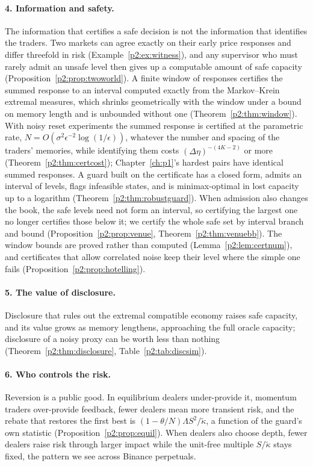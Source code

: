 \paragraph{4. Information and safety.} The information that certifies a safe decision is not the information that identifies the traders. Two markets can agree exactly on their early price responses and differ threefold in risk (Example~\ref{p2:ex:witness}), and any supervisor who must rarely admit an unsafe level then gives up a computable amount of safe capacity (Proposition~\ref{p2:prop:twoworld}). A finite window of responses certifies the summed response to an interval computed exactly from the Markov--Krein extremal measures, which shrinks geometrically with the window under a bound on memory length and is unbounded without one (Theorem~\ref{p2:thm:window}). With noisy reset experiments the summed response is certified at the parametric rate, $N=O(\sigma^2\epsilon^{-2}\log(1/\epsilon))$, whatever the number and spacing of the traders' memories, while identifying them costs $(\Delta\eta)^{-(4K-2)}$ or more (Theorem~\ref{p2:thm:certcost}); Chapter~\ref{ch:p1}'s hardest pairs have identical summed responses. A guard built on the certificate has a closed form, admits an interval of levels, flags infeasible states, and is minimax-optimal in lost capacity up to a logarithm (Theorem~\ref{p2:thm:robustguard}). When admission also changes the book, the safe levels need not form an interval, so certifying the largest one no longer certifies those below it; we certify the whole safe set by interval branch and bound (Proposition~\ref{p2:prop:venue}, Theorem~\ref{p2:thm:venuebb}). The window bounds are proved rather than computed (Lemma~\ref{p2:lem:certnum}), and certificates that allow correlated noise keep their level where the simple one fails (Proposition~\ref{p2:prop:hotelling}).

\paragraph{5. The value of disclosure.} Disclosure that rules out the extremal compatible economy raises safe capacity, and its value grows as memory lengthens, approaching the full oracle capacity; disclosure of a noisy proxy can be worth less than nothing (Theorem~\ref{p2:thm:disclosure}, Table~\ref{p2:tab:discsim}).

\paragraph{6. Who controls the risk.} Reversion is a public good. In equilibrium dealers under-provide it, momentum traders over-provide feedback, fewer dealers mean more transient risk, and the rebate that restores the first best is $(1-\theta/N)\Lambda S^2/\tilde\kappa$, a function of the guard's own statistic (Proposition~\ref{p2:prop:equil}). When dealers also choose depth, fewer dealers raise risk through larger impact while the unit-free multiple $S/\tilde\kappa$ stays fixed, the pattern we see across Binance perpetuals.

